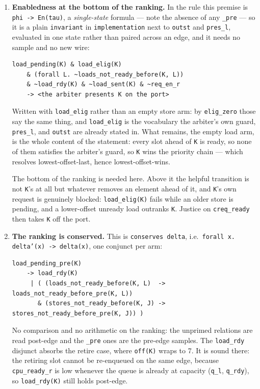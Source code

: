 \documentclass[11pt]{article}
\begin{document}
\begin{enumerate}
\item \textbf{Enabledness at the bottom of the ranking.} In the rule
  this premise is \texttt{phi -> En(tau)}, a \emph{single-state} formula
  --- note the absence of any \texttt{_pre} --- so it is a plain
  \texttt{invariant} in \texttt{implementation} next to \texttt{outst}
  and \texttt{pres_l}, evaluated in one state rather than paired across
  an edge, and it needs no sample and no new wire:

  {\small
  \begin{verbatim}
load_pending(K) & load_elig(K)
    & (forall L. ~loads_not_ready_before(K, L))
    & ~load_rdy(K) & ~load_sent(K) & ~req_en_r
    -> <the arbiter presents K on the port>
\end{verbatim}
  }

  Written with \texttt{load_elig} rather than an empty store arm: by
  \texttt{elig_zero} those say the same thing, and \texttt{load_elig} is
  the vocabulary the arbiter's own guard, \texttt{pres_l}, and
  \texttt{outst} are already stated in. What remains, the empty load
  arm, is the whole content of the statement: every slot ahead of
  \texttt{K} is ready, so none of them satisfies the arbiter's guard,
  so \texttt{K} wins the priority chain --- which resolves
  lowest-offset-last, hence lowest-offset-wins.

  The bottom of the ranking is needed here. Above it the helpful
  transition is not \texttt{K}'s at all but whatever removes an element
  ahead of it, and \texttt{K}'s own request is genuinely blocked:
  \texttt{load_elig(K)} fails while an older store is pending, and a
  lower-offset unready load outranks \texttt{K}.
  Justice on \texttt{creq_ready} then takes \texttt{K} off the port.

\item \textbf{The ranking is conserved.} This is \texttt{conserves delta},
  i.e.\ \texttt{forall x. delta'(x) -> delta(x)}, one conjunct per arm:

  {\small
  \begin{verbatim}
load_pending_pre(K)
    -> load_rdy(K)
     | ( (loads_not_ready_before(K, L)  -> loads_not_ready_before_pre(K, L))
       & (stores_not_ready_before(K, J) -> stores_not_ready_before_pre(K, J)) )
\end{verbatim}
  }

  No comparison and no arithmetic on the ranking: the unprimed
  relations are read post-edge and the \texttt{_pre} ones are the
  pre-edge samples. The \texttt{load_rdy} disjunct absorbs the retire
  case, where \texttt{off(K)} wraps to 7. It is sound there: the
  retiring slot cannot be re-enqueued on the same edge, because
  \texttt{cpu_ready_r} is low whenever the queue is already at capacity
  (\texttt{q_l}, \texttt{q_rdy}), so \texttt{load_rdy(K)} still holds
  post-edge.


\end{enumerate}
\end{document}
